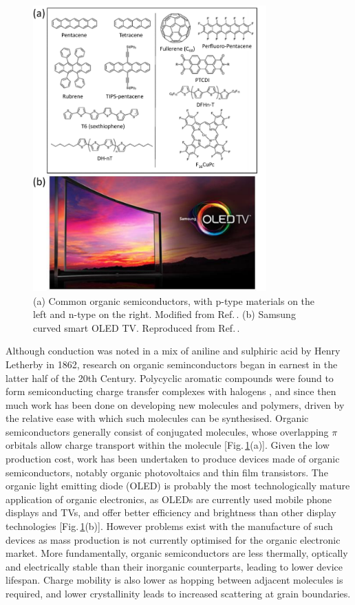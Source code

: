 \begin{figure}[h!]
\centering
\includegraphics[width=0.8\textwidth]{Fig2}
\caption{(a) Common organic semiconductors, with p-type materials on the left and n-type on the right. Modified from Ref.\,\cite{Miozzo2010}. (b) Samsung curved smart OLED TV. Reproduced from Ref.\,\cite{Samsung}.}
\label{1Fig2}
\end{figure}
Although conduction was noted in a mix of aniline and sulphiric acid by Henry Letherby in 1862, research on organic seminconductors began in earnest in the latter half of the 20th Century. Polycyclic aromatic compounds were found to form semiconducting charge transfer complexes with halogens \cite{Naarmann2002}, and since then much work has been done on developing new molecules and polymers, driven by the relative ease with which such molecules can be synthesised. Organic semiconductors generally consist of conjugated molecules, whose overlapping $\pi$ orbitals allow charge transport within the molecule [Fig.\,\ref{1Fig2}(a)]. Given the low production cost, work has been undertaken to produce devices made of organic semiconductors, notably organic photovoltaics and thin film transistors. The organic light emitting diode (OLED) is probably the most technologically mature application of organic electronics, as OLEDs are currently used mobile phone displays and TVs, and offer better efficiency and brightness than other display technologies [Fig.\,\ref{1Fig2}(b)]. However problems exist with the manufacture of such devices as mass production is not currently optimised for the organic electronic market. More fundamentally, organic semiconductors are less thermally, optically and electrically stable than their inorganic counterparts, leading to lower device lifespan. Charge mobility is also lower as hopping between adjacent molecules is required, and lower crystallinity leads to increased scattering at grain boundaries. 

